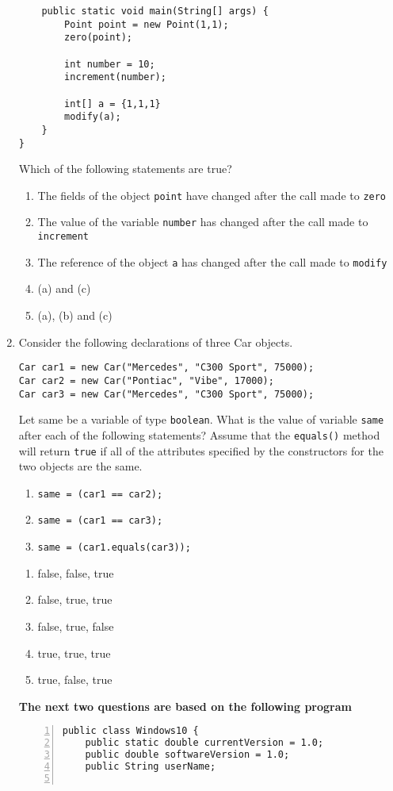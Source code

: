 \documentclass[CS180-S16-FinalExam.tex]{subfiles}
\begin{document}
\begin{enumerate}
\begin{lstlisting}
    public static void main(String[] args) {
		Point point = new Point(1,1);
        zero(point); 
        
        int number = 10;
        increment(number);
        
        int[] a = {1,1,1}
        modify(a);
    }
}
\end{lstlisting}

Which of the following statements are true?
\begin{enumerate}
\item The fields of the object \texttt{point} have changed after the call made to \texttt{zero} \ifdraft \Ans \fi
\item The value of the variable \texttt{number} has changed after the call made to \texttt{increment}
\item The reference of the object \texttt{a} has changed after the call made to \texttt{modify}
\item (a) and (c)
\item (a), (b) and (c)
\end{enumerate}
\clearpage
\item Consider the following declarations of three Car objects.
\begin{lstlisting}
Car car1 = new Car("Mercedes", "C300 Sport", 75000);
Car car2 = new Car("Pontiac", "Vibe", 17000);
Car car3 = new Car("Mercedes", "C300 Sport", 75000);
\end{lstlisting}
Let same be a variable of type \texttt{boolean}. What is the value of variable \texttt{same} after each of the following statements? Assume that the \texttt{equals()} method will return \texttt{true} if all of the attributes specified by the constructors for the two objects are the same.
\begin{enumerate}[i]
\item \texttt{same = (car1 == car2);}
\item \texttt{same = (car1 == car3);}
\item \texttt{same = (car1.equals(car3));}
\end{enumerate}
\begin{enumerate}
\item false, false, true  \ifdraft \Ans \fi
\item false, true, true
\item false, true, false
\item true, true, true
\item true, false, true
\end{enumerate}
\clearpage
\textbf{The next two questions are based on the following program}
\begin{lstlisting}[numbers=left]
public class Windows10 {
	public static double currentVersion = 1.0;
    public double softwareVersion = 1.0;
    public String userName;
    

\end{lstlisting}
\end{enumerate}
\end{document}
